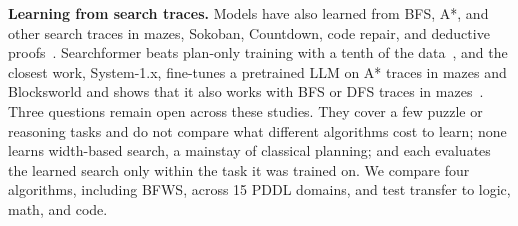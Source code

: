 \textbf{Learning from search traces.} Models have also learned from BFS, A*, and other search traces in mazes, Sokoban, Countdown, code repair, and deductive proofs~\citep{yang2022chain,lehnert2024beyond,su2024dualformer,gandhi2024stream,moon2024learning,opedal2026learning}. Searchformer beats plan-only training with a tenth of the data~\citep{lehnert2024beyond}, and the closest work, \mbox{System-1.x}, fine-tunes a pretrained LLM on A* traces in mazes and Blocksworld and shows that it also works with BFS or DFS traces in mazes~\citep{saha2024system1x}. Three questions remain open across these studies. They cover a few puzzle or reasoning tasks and do not compare what different algorithms cost to learn; none learns width-based search, a mainstay of classical planning; and each evaluates the learned search only within the task it was trained on. We compare four algorithms, including BFWS, across 15 PDDL domains, and test transfer to logic, math, and code.
